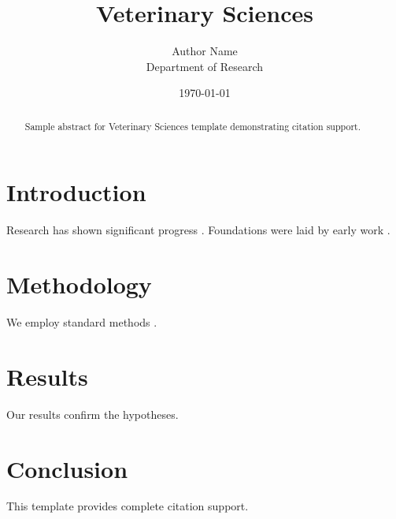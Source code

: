 \documentclass{mdpi}
\title{Veterinary Sciences}
\author{Author Name \\ \small Department of Research}
\date{\today}
\begin{document}
\maketitle

\begin{abstract}
Sample abstract for Veterinary Sciences template demonstrating citation support.
\end{abstract}

\section{Introduction}
Research has shown significant progress \citep{einstein1905}. Foundations were laid by early work \citep{turing1950}.

\section{Methodology}
We employ standard methods \citep{knuth1984}.

\section{Results}
Our results confirm the hypotheses.

\section{Conclusion}
This template provides complete citation support.



\end{document}

